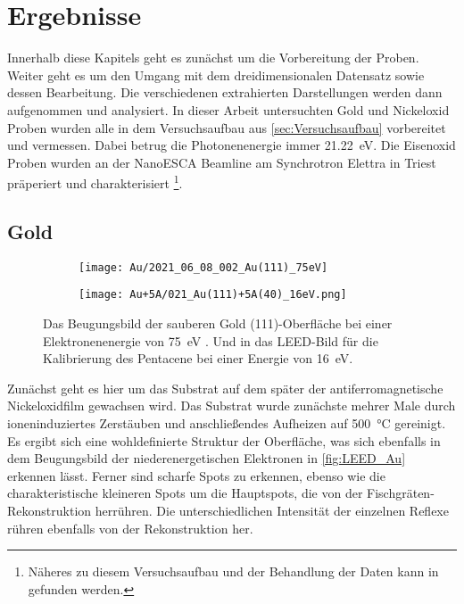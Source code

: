 \chapter{Ergebnisse}
    Innerhalb diese Kapitels geht es zunächst um die Vorbereitung der Proben.
    Weiter geht es um den Umgang mit dem dreidimensionalen Datensatz sowie dessen Bearbeitung.
    Die verschiedenen extrahierten Darstellungen werden dann aufgenommen und analysiert.
    In dieser Arbeit untersuchten Gold und Nickeloxid Proben wurden alle in dem Versuchsaufbau aus \autoref{sec:Versuchsaufbau} vorbereitet und vermessen.
    Dabei betrug die Photonenenergie immer \SI{21.22}{\electronvolt}.
    Die Eisenoxid Proben wurden an der NanoESCA Beamline am Synchrotron Elettra in Triest präperiert und charakterisiert \footnote{Näheres zu diesem Versuchsaufbau und der Behandlung der Daten kann in \cite{ma-DJ} gefunden werden.}.

    \section{Gold}
        \begin{figure}
            \centering
            \begin{subfigure}{0.48\textwidth}
                \centering
                \texttt{[image: Au/2021\_06\_08\_002\_Au(111)\_75eV]}
                \subcaption{}
                \label{fig:LEED_Au}
            \end{subfigure}
            \begin{subfigure}{0.48\textwidth}
                \centering
                \texttt{[image: Au+5A/021\_Au(111)+5A(40)\_16eV.png]}
                \subcaption{}
                \label{fig:LEED_Au+5A}
            \end{subfigure}
            \caption{Das Beugungsbild der sauberen Gold (111)-Oberfläche bei einer Elektronenenergie von \SI{75}{\electronvolt} .
            Und in  das LEED-Bild für die Kalibrierung des Pentacene bei einer Energie von \SI{16}{\electronvolt}.}
        \label{fig:Substrate}
        \end{figure}
        Zunächst geht es hier um das Substrat auf dem später der antiferromagnetische Nickeloxidfilm gewachsen wird.
        Das Substrat wurde zunächste mehrer Male durch ioneninduziertes Zerstäuben und anschließendes Aufheizen auf \SI{500}{\celsius} gereinigt.
        Es ergibt sich eine wohldefinierte Struktur der Oberfläche, was sich ebenfalls in dem Beugungsbild der niederenergetischen Elektronen in \autoref{fig:LEED_Au} erkennen lässt.
        Ferner sind scharfe Spots zu erkennen, ebenso wie die charakteristische kleineren Spots um die Hauptspots, die von der Fischgräten-Rekonstruktion herrühren.
        Die unterschiedlichen Intensität der einzelnen Reflexe rühren ebenfalls von der Rekonstruktion her.

